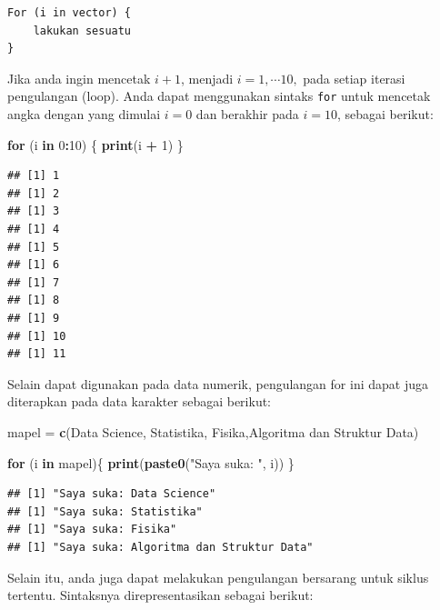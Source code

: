 \documentclass[
]{book}
\newenvironment{Shaded}{\begin{snugshade}}{\end{snugshade}}
\newcommand{\ControlFlowTok}[1]{\textcolor[rgb]{0.13,0.29,0.53}{\textbf{#1}}}
\newcommand{\DecValTok}[1]{\textcolor[rgb]{0.00,0.00,0.81}{#1}}
\newcommand{\FunctionTok}[1]{\textcolor[rgb]{0.13,0.29,0.53}{\textbf{#1}}}
\newcommand{\NormalTok}[1]{#1}
\newcommand{\OtherTok}[1]{\textcolor[rgb]{0.56,0.35,0.01}{#1}}
\newcommand{\SpecialCharTok}[1]{\textcolor[rgb]{0.81,0.36,0.00}{\textbf{#1}}}
\newcommand{\StringTok}[1]{\textcolor[rgb]{0.31,0.60,0.02}{#1}}
\begin{document}
\begin{verbatim}
For (i in vector) {
    lakukan sesuatu     
}
\end{verbatim}

Jika anda ingin mencetak \(i + 1\), menjadi \(i = 1,\cdots 10,\) pada setiap iterasi pengulangan (loop). Anda dapat menggunakan sintaks \texttt{for} untuk mencetak angka dengan yang dimulai \(i = 0\) dan berakhir pada \(i = 10\), sebagai berikut:

\begin{Shaded}
\begin{Highlighting}[]
\ControlFlowTok{for}\NormalTok{ (i }\ControlFlowTok{in} \DecValTok{0}\SpecialCharTok{:}\DecValTok{10}\NormalTok{) \{}
  \FunctionTok{print}\NormalTok{(i }\SpecialCharTok{+} \DecValTok{1}\NormalTok{)}
\NormalTok{\}}
\end{Highlighting}
\end{Shaded}

\begin{verbatim}
## [1] 1
## [1] 2
## [1] 3
## [1] 4
## [1] 5
## [1] 6
## [1] 7
## [1] 8
## [1] 9
## [1] 10
## [1] 11
\end{verbatim}

Selain dapat digunakan pada data numerik, pengulangan for ini dapat juga diterapkan pada data karakter sebagai berikut:

\begin{Shaded}
\begin{Highlighting}[]
\NormalTok{mapel }\OtherTok{=} \FunctionTok{c}\NormalTok{(}\StringTok{\textquotesingle{}Data Science\textquotesingle{}}\NormalTok{, }\StringTok{\textquotesingle{}Statistika\textquotesingle{}}\NormalTok{, }\StringTok{\textquotesingle{}Fisika\textquotesingle{}}\NormalTok{,}\StringTok{\textquotesingle{}Algoritma dan Struktur Data\textquotesingle{}}\NormalTok{)}

\ControlFlowTok{for}\NormalTok{ (i }\ControlFlowTok{in}\NormalTok{ mapel)\{}
   \FunctionTok{print}\NormalTok{(}\FunctionTok{paste0}\NormalTok{(}\StringTok{"Saya suka: "}\NormalTok{, i))}
\NormalTok{\}}
\end{Highlighting}
\end{Shaded}

\begin{verbatim}
## [1] "Saya suka: Data Science"
## [1] "Saya suka: Statistika"
## [1] "Saya suka: Fisika"
## [1] "Saya suka: Algoritma dan Struktur Data"
\end{verbatim}

Selain itu, anda juga dapat melakukan pengulangan bersarang untuk siklus tertentu. Sintaksnya direpresentasikan sebagai berikut:
\end{document}
